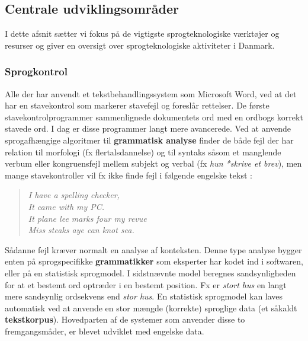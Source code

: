 \documentclass[]{../../metanetpaper}
\begin{document}
\begin{multicols}{2}
\subsection{Centrale udviklingsområder} 

I dette afsnit s\ae tter vi fokus \mbox{p\aa} de vigtigste sprogteknologiske v\ae rkt\o jer og resurser og giver en oversigt over sprogteknologiske aktiviteter i Danmark. 


\subsubsection{Sprogkontrol}

 Alle der har anvendt et tekstbehandlingssystem som Microsoft Word, ved at det har en stavekontrol som markerer stavefejl og foresl\aa r rettelser. De f\o rste stavekontrolprogrammer sammenlignede dokumentets ord med en ordbogs korrekt stavede ord. I dag er disse programmer langt mere avancerede. Ved at anvende sprogafh\ae ngige algoritmer til {\bf grammatisk analyse} finder de b\aa de fejl der har relation til morfologi (fx flertalsdannelse) og til syntaks s\aa som et manglende verbum eller kongruensfejl mellem subjekt og verbal (fx {\it hun *skrive et brev}), men mange stavekontroller vil fx ikke finde fejl i f\o lgende engelske tekst \cite{zar1}:

\begin{quote}
 {\it  I have a spelling checker,\\
  It came with my PC.\\
  It plane lee marks four my revue\\
  Miss steaks aye can knot sea.}
\end{quote}

S\aa danne fejl kr\ae ver normalt en analyse af konteksten. Denne type analyse bygger enten \mbox{p\aa} sprogspecifikke {\bf grammatikker} som eksperter har kodet ind i softwaren, eller \mbox{p\aa} en statistisk sprogmodel. I sidstn\ae vnte model beregnes sandsynligheden for at et bestemt ord optr\ae der i en bestemt position. Fx er {\it stort hus}  en langt mere sandsynlig ordsekvens end {\it stor hus}. En statistisk sprogmodel kan laves automatisk ved at anvende en stor m\ae ngde (korrekte) sproglige data (et s\aa kaldt {\bf tekstkorpus}). Hovedparten af de systemer som anvender disse to fremgangsm\aa der, er blevet udviklet med engelske data. 


\end{multicols}
\end{document}
